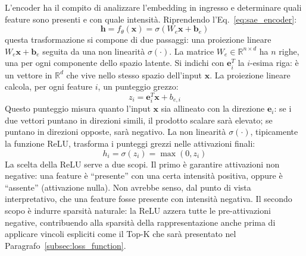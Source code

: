 L'encoder ha il compito di analizzare l'embedding in ingresso e determinare quali feature sono presenti e con quale intensità. Riprendendo l'Eq.~\ref{eq:sae_encoder}:
\begin{equation}
    \mathbf{h} = f_\theta(\mathbf{x}) = \sigma(W_e \mathbf{x} + \mathbf{b}_e)
\end{equation}
questa trasformazione si compone di due passaggi: una proiezione lineare $W_e \mathbf{x} + \mathbf{b}_e$ seguita da una non linearità $\sigma(\cdot)$.
La matrice $W_e \in \mathbb{R}^{n \times d}$ ha $n$ righe, una per ogni componente dello spazio latente. Si indichi con $\mathbf{e}_i^T$ la $i$-esima riga: è un vettore in $\mathbb{R}^d$ che vive nello stesso spazio dell'input $\mathbf{x}$. La proiezione lineare calcola, per ogni feature $i$, un punteggio grezzo:
\begin{equation}
    z_i = \mathbf{e}_i^T \mathbf{x} + b_{e,i}
\end{equation}
Questo punteggio misura quanto l'input $\mathbf{x}$ sia allineato con la direzione $\mathbf{e}_i$: se i due vettori puntano in direzioni simili, il prodotto scalare sarà elevato; se puntano in direzioni opposte, sarà negativo.
La non linearità $\sigma(\cdot)$, tipicamente la funzione ReLU, trasforma i punteggi grezzi nelle attivazioni finali:
\begin{equation}
    h_i = \sigma(z_i) = \max(0, z_i)
\end{equation}
La scelta della ReLU serve a due scopi. Il primo è garantire attivazioni non negative: una feature è ``presente'' con una certa intensità positiva, oppure è ``assente'' (attivazione nulla). Non avrebbe senso, dal punto di vista interpretativo, che una feature fosse presente con intensità negativa. Il secondo scopo è indurre sparsità naturale: la ReLU azzera tutte le pre-attivazioni negative, contribuendo alla sparsità della rappresentazione anche prima di applicare vincoli espliciti come il Top-K che sarà presentato nel Paragrafo~\ref{subsec:loss_function}.
